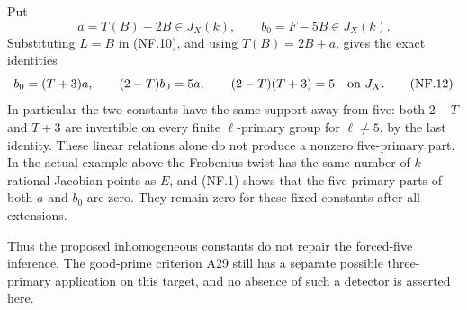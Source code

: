 Put
\[
             a=T(B)-2B\in J_X(k),
             \qquad b_0=F-5B\in J_X(k).
 \tag{NF.11}
\]
Substituting $L=B$ in (NF.10), and using $T(B)=2B+a$,
gives the exact identities
\[
       b_0=(T+3)a,
       \qquad (2-T)b_0=5a,
       \qquad (2-T)(T+3)=5\quad\hbox{on }J_X.
 \tag{NF.12}
\]
In particular the two constants have the same support away from
five: both $2-T$ and $T+3$ are invertible on every finite
$\ell$-primary group for $\ell\ne5$, by the last identity.
These linear relations alone do not produce a nonzero five-primary
part. In the actual example above the Frobenius twist has the same
number of $k$-rational Jacobian points as $E$, and (NF.1) shows
that the five-primary parts of both $a$ and $b_0$ are zero.
They remain zero for these fixed constants after all extensions.

Thus the proposed inhomogeneous constants do not repair the
forced-five inference. The good-prime criterion A29 still has a
separate possible three-primary application on this target, and
no absence of such a detector is asserted here.
